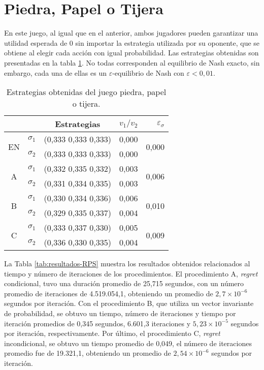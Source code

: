 \section*{Piedra, Papel o Tijera}

En este juego, al igual que en el anterior, ambos jugadores pueden garantizar una utilidad esperada de $0$ sin importar la estrategia utilizada por su oponente, que se obtiene al elegir cada acción con igual probabilidad. Las estrategias obtenidas son presentadas en la tabla \ref{tab:estrategias-RPS}. No todas corresponden al equilibrio de Nash exacto, sin embargo, cada una de ellas es un $\varepsilon$-equilibrio de Nash con $\varepsilon < 0,01$.

\begin{table}[h]
    \centering
    \caption{Estrategias obtenidas del juego piedra, papel o tijera.}
    \label{tab:estrategias-RPS}
    \begin{tabular}{c c c r r}
        \toprule
        & & Estrategias & $v_1 / v_2$ & $\varepsilon_{\sigma}$ \\
        \midrule
        \multirow{2}{*}{EN}
        & $\sigma_1$ & (0,333 0,333 0,333) & 0,000 & \multirow{2}{*}{0,000}\\
        & $\sigma_2$ & (0,333 0,333 0,333) & 0,000 & \\
        \hline
        \multirow{2}{*}{A}
        & $\sigma_1$ & (0,332 0,335 0,332) & 0,003 & \multirow{2}{*}{0,006}\\
        & $\sigma_2$ & (0,331 0,334 0,335) & 0,003 & \\
        \hline
        \multirow{2}{*}{B}
        & $\sigma_1$ & (0,330 0,334 0,336) & 0,006 & \multirow{2}{*}{0,010}\\
        & $\sigma_2$ & (0,329 0,335 0,337) & 0,004 & \\
        \hline
        \multirow{2}{*}{C}
        & $\sigma_1$ & (0,333 0,337 0,330) & 0,005 & \multirow{2}{*}{0,009} \\
        & $\sigma_2$ & (0,336 0,330 0,335) & 0,004 & \\
        \bottomrule
    \end{tabular}
\end{table}

La Tabla \ref{tab:resultados-RPS} muestra los resultados obtenidos relacionados al tiempo y número de iteraciones de los procedimientos. El procedimiento A, \textit{regret} condicional, tuvo una duración promedio de 25,715 segundos, con un número promedio de iteraciones de 4.519.054,1, obteniendo un promedio de $2,7 {\times} 10^{-6}$ segundos por iteración. Con el procedimiento B, que utiliza un vector invariante de probabilidad, se obtuvo un tiempo, número de iteraciones y tiempo por iteración promedios de 0,345 segundos, 6.601,3 iteraciones y $5,23 {\times} 10^{-5}$ segundos por iteración, respectivamente. Por último, el procedimiento C, \textit{regret} incondicional, se obtuvo un tiempo promedio de 0,049, el número de iteraciones promedio fue de 19.321,1, obteniendo un promedio de $2,54 {\times} 10^{-6}$ segundos por iteración.

